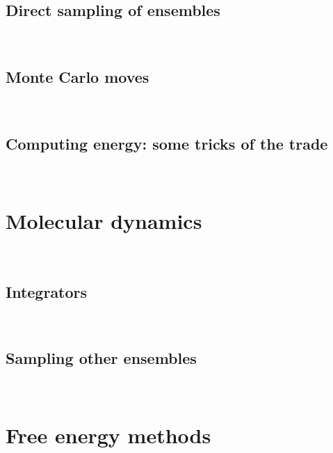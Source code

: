 \documentclass[thesis]{subfiles}
\begin{document}
\subsection{Direct sampling of ensembles}
~

\subsection{Monte Carlo moves}
~

\subsection{Computing energy: some tricks of the trade}
~

\section{Molecular dynamics}
~

\subsection{Integrators}
~

\subsection{Sampling other ensembles}
~

\section{Free energy methods}
~

\OnlyInSubfile{\printbibliography}
\end{document}
